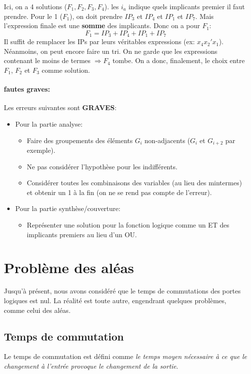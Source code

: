 Ici, on a 4 solutions ($F_1,F_2,F_3,F_4$). les $i_a$ indique quels implicants premier il faut prendre. Pour le 1 ($F_1$), on doit prendre $IP_3$ et $IP_4$ et $IP_1$ et $IP_7$. Mais l'expression finale est une \textbf{somme} des implicants. Donc on a pour $F_1$:
\begin{equation}
	F_1=IP_3+IP_4+IP_1+IP_7
\end{equation}
Il suffit de remplacer les IPs par leurs véritables expressions (ex: $x_4x_2'x_1$).\\

Néanmoins, on peut encore faire un tri. On ne garde que les expressions contenant le moins de termes $\Rightarrow F_4$ tombe. On a donc, finalement, le choix entre $F_1$, $F_2$ et $F_3$ comme solution. 
\paragraph{fautes graves:}
Les erreurs suivantes sont \textbf{GRAVES}:
\begin{itemize}
	\item Pour la partie analyse:
	\begin{itemize}
		\item Faire des groupements des éléments $G_i$ non-adjacents ($G_i$ et $G_{i+2}$ par exemple).
		\item Ne pas considérer l'hypothèse pour les indifférents.
		\item Considérer toutes les combinaisons des variables (au lieu des mintermes) et obtenir un 1 à la fin (on ne se rend pas compte de l'erreur).
	\end{itemize}
	\item Pour la partie synthèse/couverture:
	\begin{itemize}
		\item Représenter une solution pour la fonction logique comme un ET des implicants premiers au lieu d'un OU.
	\end{itemize}
\end{itemize}
\section{Problème des aléas}
Jusqu'à présent, nous avons considéré que le temps de commutations des portes logiques est nul. La réalité est toute autre, engendrant quelques problèmes, comme celui des aléas.
\subsection{Temps de commutation}
Le temps de commutation est défini comme \textit{le temps moyen nécessaire à ce que le changement à l’entrée provoque le changement de la sortie}.\\

